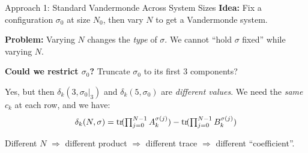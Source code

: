 \documentclass[aspectratio=169,10pt]{beamer}
\begin{document}
\begin{frame}{Approach 1: Standard Vandermonde Across System Sizes}
\vspace{-0.3em}
{\small\textbf{Idea:} Fix a configuration $\sigma_0$ at size $N_0$, then vary $N$ to get a Vandermonde system.}

\vspace{0.2em}
{\small\textbf{Problem:} Varying $N$ changes the \emph{type} of $\sigma$. We cannot ``hold $\sigma$ fixed'' while varying $N$.}

\vspace{0.3em}
\begin{center}
\end{center}

\vspace{0.3em}
{\small\textbf{Could we restrict $\sigma_0$?} Truncate $\sigma_0$ to its first 3 components?}

\vspace{0.1em}
{\small Yes, but then $\delta_k(3, \sigma_0|_3)$ and $\delta_k(5, \sigma_0)$ are \emph{different values}. We need the \emph{same} $c_k$ at each row, and we have:}
\[
\delta_k(N, \sigma) = \mathrm{tr}\!(\textstyle\prod_{j=0}^{N-1} A_k^{\sigma(j)}) - \mathrm{tr}\!(\textstyle\prod_{j=0}^{N-1} B_k^{\sigma(j)})
\]

\vspace{-0.2em}
{\small Different $N$ $\Rightarrow$ different product $\Rightarrow$ different trace $\Rightarrow$ different ``coefficient''.}

\vspace{0.3em}
\end{frame}
\end{document}
